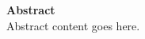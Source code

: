 %
%
\thispagestyle{plain}
{\noindent \huge \bf Abstract}\\[20mm]

Abstract content goes here.


\cleardoublepage
